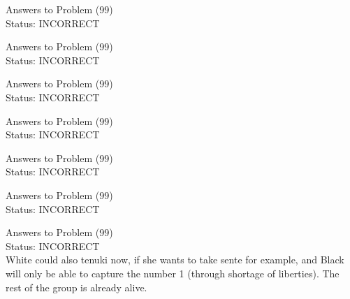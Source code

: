 \documentclass[11pt]{article}
\begin{document}
\begin{minipage}[t]{0.5\textwidth}
  {\centering
  
  Answers to Problem (99)\\
  Status: INCORRECT\\
  
  }
\end{minipage}
\begin{minipage}[t]{0.5\textwidth}
  {\centering
  
  Answers to Problem (99)\\
  Status: INCORRECT\\
  
  }
\end{minipage}
\begin{minipage}[t]{0.5\textwidth}
  {\centering
  
  Answers to Problem (99)\\
  Status: INCORRECT\\
  
  }
\end{minipage}
\begin{minipage}[t]{0.5\textwidth}
  {\centering
  
  Answers to Problem (99)\\
  Status: INCORRECT\\
  
  }
\end{minipage}
\begin{minipage}[t]{0.5\textwidth}
  {\centering
  
  Answers to Problem (99)\\
  Status: INCORRECT\\
  
  }
\end{minipage}
\begin{minipage}[t]{0.5\textwidth}
  {\centering
  
  Answers to Problem (99)\\
  Status: INCORRECT\\
  
  }
\end{minipage}
\begin{minipage}[t]{0.5\textwidth}
  {\centering
  
  Answers to Problem (99)\\
  Status: INCORRECT\\
  White could also tenuki now, if she wants to take sente for example, and Black will only be able to capture the number 1 (through shortage of liberties). The rest of the group is already alive.\\
  }
\end{minipage}
\end{document}
